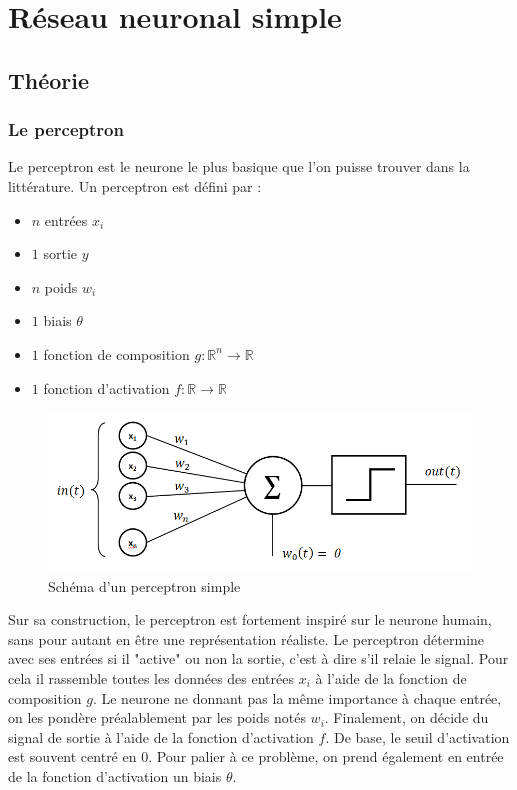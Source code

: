 
\chapter{Réseau neuronal simple}

\section{Théorie}

\subsection{Le perceptron}

Le perceptron est le neurone le plus basique que l'on puisse trouver dans la
littérature. Un perceptron est défini par :
\begin{itemize}
\item $n$ entrées $x_i$
\item $1$ sortie $y$
\item $n$ poids $w_i$
\item $1$ biais $\theta$
\item $1$ fonction de composition $g : \mathbb{R}^n \to \mathbb{R}$
\item $1$ fonction d'activation $f : \mathbb{R} \to \mathbb{R}$
\end{itemize}

\begin{figure}[!ht]
\begin{center}
\includegraphics[scale=0.8]{images/perceptron.png}
\end{center}
\caption{Schéma d'un perceptron simple}
\end{figure}

\vspace{\parskip}
Sur sa construction, le perceptron est fortement inspiré sur le neurone humain,
sans pour autant en être une représentation réaliste.
Le perceptron détermine avec ses entrées si il "active" ou non la sortie, c'est
à dire s'il relaie le signal. Pour cela il rassemble toutes les données des
entrées $x_i$ à l'aide de la fonction de composition $g$. Le neurone ne donnant
pas la même importance à chaque entrée, on les pondère préalablement par les
poids notés $w_i$.
Finalement, on décide du signal de sortie à l'aide de la fonction d'activation
$f$. De base, le seuil d'activation est souvent centré en $0$. Pour palier à ce
problème, on prend également en entrée de la fonction d'activation un biais
$\theta$.


